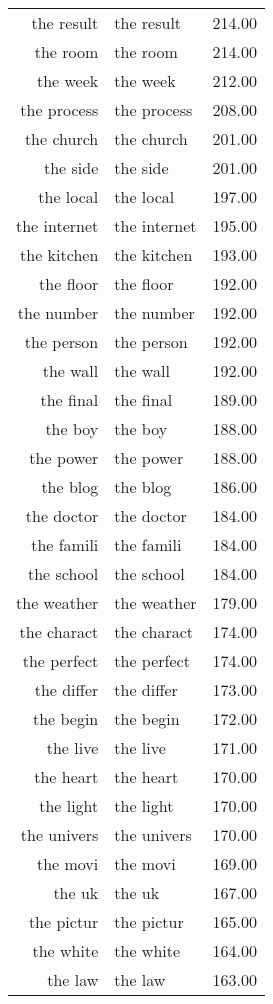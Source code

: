 \begin{table}[ht]
\begin{tabular}{rlr}
  the result & the result & 214.00 \\ 
  the room & the room & 214.00 \\ 
  the week & the week & 212.00 \\ 
  the process & the process & 208.00 \\ 
  the church & the church & 201.00 \\ 
  the side & the side & 201.00 \\ 
  the local & the local & 197.00 \\ 
  the internet & the internet & 195.00 \\ 
  the kitchen & the kitchen & 193.00 \\ 
  the floor & the floor & 192.00 \\ 
  the number & the number & 192.00 \\ 
  the person & the person & 192.00 \\ 
  the wall & the wall & 192.00 \\ 
  the final & the final & 189.00 \\ 
  the boy & the boy & 188.00 \\ 
  the power & the power & 188.00 \\ 
  the blog & the blog & 186.00 \\ 
  the doctor & the doctor & 184.00 \\ 
  the famili & the famili & 184.00 \\ 
  the school & the school & 184.00 \\ 
  the weather & the weather & 179.00 \\ 
  the charact & the charact & 174.00 \\ 
  the perfect & the perfect & 174.00 \\ 
  the differ & the differ & 173.00 \\ 
  the begin & the begin & 172.00 \\ 
  the live & the live & 171.00 \\ 
  the heart & the heart & 170.00 \\ 
  the light & the light & 170.00 \\ 
  the univers & the univers & 170.00 \\ 
  the movi & the movi & 169.00 \\ 
  the uk & the uk & 167.00 \\ 
  the pictur & the pictur & 165.00 \\ 
  the white & the white & 164.00 \\ 
  the law & the law & 163.00 \\ 

\end{tabular}
\end{table}
